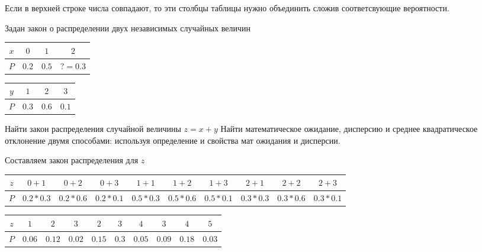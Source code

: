 \documentclass[a4paper]{article}
\begin{document}
Если в верхней строке числа совпадают, то эти столбцы таблицы нужно объединить сложив соответсвующие вероятности.

Задан закон о распределении двух независимых случайных величин

\begin{table}[H]
\centering
\begin{tabular}{|c|c|c|c|}
\hline
$x$ & $0$ & $1$ & $2$ \\
\hline
$P$ & $0.2$ & $0.5$ & $? = 0.3$ \\
\hline
\end{tabular}
\end{table}
    
\begin{table}[H]
\centering
\begin{tabular}{|c|c|c|c|}
\hline
$y$ & $1$ & $2$ & $3$ \\
\hline
$P$ & $0.3$ & $0.6$ & $ 0.1 $ \\
\hline
\end{tabular}
\end{table}

Найти закон распределения случайной величины $z = x + y$
Найти математическое ожидание, дисперсию и среднее квадратическое отклонение двумя способами:
используя определение и свойства мат ожидания и дисперсии.

Составляем закон распределения для $z$

\begin{table}[H]
\centering
\begin{tabular}{|c|c|c|c|c|c|c|c|c|c|}
\hline
$z$ & $0 + 1$ & $0 + 2$ & $0 + 3$ & $1 + 1$ & $1 + 2$ & $1 + 3$ & $2 + 1$ & $2 + 2$ & $2 + 3$ \\
\hline
$P$ & $0.2 * 0.3$ & $0.2 * 0.6$ & $0.2 * 0.1$ & $0.5 * 0.3$ & $0.5 * 0.6$ & $0.5 * 0.1$ & $0.3 * 0.3$ & $0.3 * 0.6$ & $0.3 * 0.1$ \\
\hline
\end{tabular}
\end{table}

\begin{table}[H]
\centering
\begin{tabular}{|c|c|c|c|c|c|c|c|c|c|}
\hline
$z$ & $1$ & $2$ & $3$ & $2$ & $3$ & $4$ & $3$ & $4$ & $5$ \\
\hline
$P$ & $0.06$ & $0.12$ & $0.02$ & $0.15$ & $0.3$ & $0.05$ & $0.09$ & $0.18$ & $0.03$ \\
\hline
\end{tabular}
\end{table}
\end{document}
